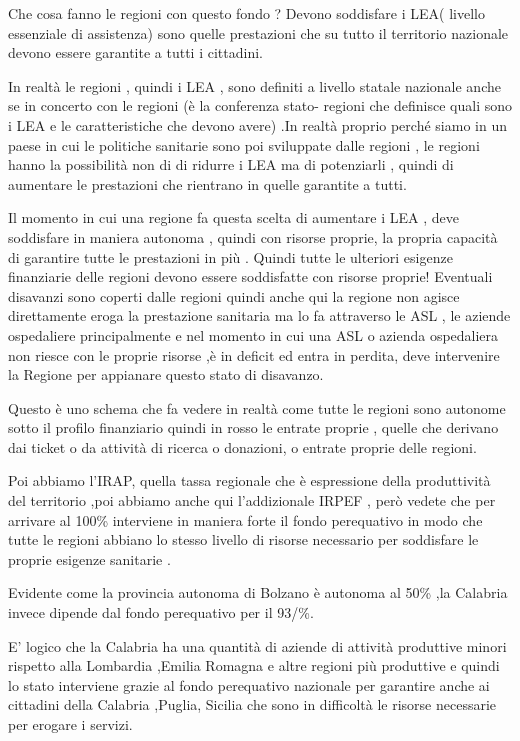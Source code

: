 \documentclass[]{article}
\begin{document}
Che cosa fanno le regioni con questo fondo ? Devono soddisfare i LEA(
livello essenziale di assistenza) sono quelle prestazioni che su tutto
il territorio nazionale devono essere garantite a tutti i cittadini.

In realtà le regioni , quindi i LEA , sono definiti a livello statale
nazionale anche se in concerto con le regioni (è la conferenza stato-
regioni che definisce quali sono i LEA e le caratteristiche che devono
avere) .In realtà proprio perché siamo in un paese in cui le politiche
sanitarie sono poi sviluppate dalle regioni , le regioni hanno la
possibilità non di di ridurre i LEA ma di potenziarli , quindi di
aumentare le prestazioni che rientrano in quelle garantite a tutti.

Il momento in cui una regione fa questa scelta di aumentare i LEA , deve
soddisfare in maniera autonoma , quindi con risorse proprie, la propria
capacità di garantire tutte le prestazioni in più . Quindi tutte le
ulteriori esigenze finanziarie delle regioni devono essere soddisfatte
con risorse proprie! Eventuali disavanzi sono coperti dalle regioni
quindi anche qui la regione non agisce direttamente eroga la prestazione
sanitaria ma lo fa attraverso le ASL , le aziende ospedaliere
principalmente e nel momento in cui una ASL o azienda ospedaliera non
riesce con le proprie risorse ,è in deficit ed entra in perdita, deve
intervenire la Regione per appianare questo stato di disavanzo.

Questo è uno schema che fa vedere in realtà come tutte le regioni sono
autonome sotto il profilo finanziario quindi in rosso le entrate proprie
, quelle che derivano dai ticket o da attività di ricerca o donazioni, o
entrate proprie delle regioni.

Poi abbiamo l'IRAP, quella tassa regionale che è espressione della
produttività del territorio ,poi abbiamo anche qui l'addizionale IRPEF ,
però vedete che per arrivare al 100\% interviene in maniera forte il
fondo perequativo in modo che tutte le regioni abbiano lo stesso livello
di risorse necessario per soddisfare le proprie esigenze sanitarie .

Evidente come la provincia autonoma di Bolzano è autonoma al 50\% ,la
Calabria invece dipende dal fondo perequativo per il 93/\%.

E' logico che la Calabria ha una quantità di aziende di attività
produttive minori rispetto alla Lombardia ,Emilia Romagna e altre
regioni più produttive e quindi lo stato interviene grazie al fondo
perequativo nazionale per garantire anche ai cittadini della Calabria
,Puglia, Sicilia che sono in difficoltà le risorse necessarie per
erogare i servizi.
\end{document}
